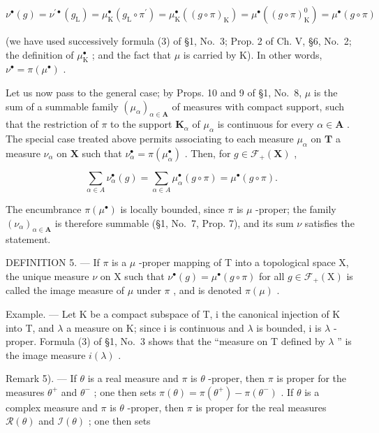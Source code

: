 \[
\nu^ {\bullet} (g) = \nu^ {\prime \bullet} (g _ {\mathrm{L}}) = \mu_ {\mathrm{K}} ^ {\bullet} (g _ {\mathrm{L}} \circ \pi^ {\prime}) = \mu_ {\mathrm{K}} ^ {\bullet} ((g \circ \pi) _ {\mathrm{K}}) = \mu^ {\bullet} ((g \circ \pi) _ {\mathrm{K}} ^ {0}) = \mu^ {\bullet} (g \circ \pi)
\]

(we have used successively formula (3) of §1, No.~3; Prop. 2 of Ch. V, §6, No.~2; the definition of \(\mu_{\mathrm{K}}^{\bullet}\) ; and the fact that \(\mu\) is carried by K). In other words, \(\nu^{\bullet} = \pi(\mu^{\bullet})\) .

Let us now pass to the general case; by Props. 10 and 9 of §1, No.~8, \(\mu\) is the sum of a summable family \((\mu_{\alpha})_{\alpha \in \mathbf{A}}\) of measures with compact support, such that the restriction of \(\pi\) to the support \(\mathbf{K}_{\alpha}\) of \(\mu_{\alpha}\) is continuous for every \(\alpha \in \mathbf{A}\) . The special case treated above permits associating to each measure \(\mu_{\alpha}\) on \(\mathbf{T}\) a measure \(\nu_{\alpha}\) on \(\mathbf{X}\) such that \(\nu_{\alpha}^{\bullet} = \pi (\mu_{\alpha}^{\bullet})\) . Then, for \(g \in \mathcal{F}_{+}(\mathbf{X})\) ,

\[
\sum_ {\alpha \in A} \nu_ {\alpha} ^ {\bullet} (g) = \sum_ {\alpha \in A} \mu_ {\alpha} ^ {\bullet} (g \circ \pi) = \mu^ {\bullet} (g \circ \pi).
\]

The encumbrance \(\pi (\mu^{\bullet})\) is locally bounded, since \(\pi\) is \(\mu\) -proper; the family \((\nu_{\alpha})_{\alpha \in \mathbf{A}}\) is therefore summable (§1, No.~7, Prop. 7), and its sum \(\nu\) satisfies the statement.

DEFINITION 5. --- If \(\pi\) is a \(\mu\) -proper mapping of T into a topological space X, the unique measure \(\nu\) on X such that \(\nu^{\bullet}(g) = \mu^{\bullet}(g \circ \pi)\) for all \(g \in \mathcal{F}_{+}(\mathrm{X})\) is called the image measure of \(\mu\) under \(\pi\) , and is denoted \(\pi(\mu)\) .

Example. --- Let K be a compact subspace of T, i the canonical injection of K into T, and \(\lambda\) a measure on K; since i is continuous and \(\lambda\) is bounded, i is \(\lambda\) -proper. Formula (3) of §1, No.~3 shows that the ``measure on T defined by \(\lambda\) '' is the image measure \(i(\lambda)\) .

Remark 5). --- If \(\theta\) is a real measure and \(\pi\) is \(\theta\) -proper, then \(\pi\) is proper for the measures \(\theta^{+}\) and \(\theta^{-}\) ; one then sets \(\pi(\theta) = \pi(\theta^{+}) - \pi(\theta^{-})\) . If \(\theta\) is a complex measure and \(\pi\) is \(\theta\) -proper, then \(\pi\) is proper for the real measures \(\mathcal{R}(\theta)\) and \(\mathcal{I}(\theta)\) ; one then sets

